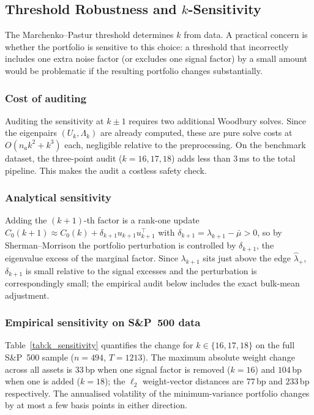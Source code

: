 \subsection{Threshold Robustness and \texorpdfstring{$k$}{k}-Sensitivity}\label{sec:ksensitivity}

The Marchenko--Pastur threshold determines $k$ from data. A practical concern is
whether the portfolio is sensitive to this choice: a threshold that incorrectly
includes one extra noise factor (or excludes one signal factor) by a small amount
would be problematic if the resulting portfolio changes substantially.

\subsubsection{Cost of auditing}

Auditing the sensitivity at $k \pm 1$ requires two additional Woodbury solves.
Since the eigenpairs $(U_k, \Lambda_k)$ are already computed, these are pure solve
costs at $O(n_a k^2 + k^3)$ each, negligible relative to the preprocessing.
On the benchmark dataset, the three-point audit ($k = 16, 17, 18$) adds less than
$3$\,ms to the total pipeline. This makes the audit a costless safety check.

\subsubsection{Analytical sensitivity}

Adding the $(k+1)$-th factor is a rank-one update
$C_0(k+1) \approx C_0(k) + \delta_{k+1} u_{k+1}u_{k+1}^\top$ with
$\delta_{k+1} = \lambda_{k+1} - \bar\mu > 0$, so by Sherman--Morrison the portfolio
perturbation is controlled by $\delta_{k+1}$, the eigenvalue excess of the marginal
factor. Since $\lambda_{k+1}$ sits just above the edge $\hat\lambda_+$,
$\delta_{k+1}$ is small relative to the signal excesses and the perturbation is
correspondingly small; the empirical audit below includes the exact bulk-mean
adjustment.

\subsubsection{Empirical sensitivity on S\&P~500 data}

Table~\ref{tab:k_sensitivity} quantifies the change for $k \in \{16, 17, 18\}$
on the full S\&P~500 sample ($n = 494$, $T = 1213$). The maximum absolute weight
change across all assets is $33$\,bp when one signal factor is removed ($k = 16$)
and $104$\,bp when one is added ($k = 18$); the $\ell_2$ weight-vector distances
are $77$\,bp and $233$\,bp respectively. The annualised volatility of the
minimum-variance portfolio changes by at most a few basis points in either
direction.

